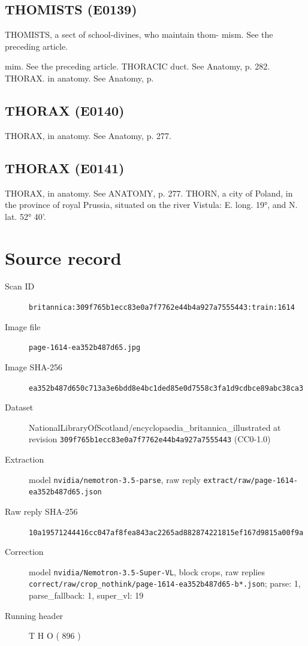 \documentclass{article}
\begin{document}
\subsection*{THOMISTS (E0139)}
THOMISTS, a sect of school-divines, who maintain thom-
mism. See the preceding article.

mim. See the preceding article.
THORACIC duct. See Anatomy, p. 282.
THORAX. in anatomy. See Anatomy, p.

\subsection*{THORAX (E0140)}
THORAX, in anatomy. See Anatomy, p. 277.

\subsection*{THORAX (E0141)}
THORAX, in anatomy. See ANATOMY, p. 277.
THORN, a city of Poland, in the province of royal Prussia, situated on the river Vistula: E. long. 19°, and N. lat. 52° 40'.


\section*{Source record}
\begin{description}
\item[Scan ID] \texttt{britannica:309f765b1ecc83e0a7f7762e44b4a927a7555443:train:1614}
\item[Image file] \texttt{page-1614-ea352b487d65.jpg}
\item[Image SHA-256] \texttt{ea352b487d650c713a3e6bdd8e4bc1ded85e0d7558c3fa1d9cdbce89abc38ca3}
\item[Dataset] NationalLibraryOfScotland/encyclopaedia\_britannica\_illustrated at revision \texttt{309f765b1ecc83e0a7f7762e44b4a927a7555443} (CC0-1.0)
\item[Extraction] model \texttt{nvidia/nemotron-3.5-parse}, raw reply \texttt{extract/raw/page-1614-ea352b487d65.json}
\item[Raw reply SHA-256] \texttt{10a19571244416cc047af8fea843ac2265ad882874221815ef167d9815a00f9a}
\item[Correction] model \texttt{nvidia/Nemotron-3.5-Super-VL}, block crops, raw replies \texttt{correct/raw/crop\_nothink/page-1614-ea352b487d65-b*.json}; parse: 1, parse\_fallback: 1, super\_vl: 19
\item[Running header] T H O ( 896 )
\end{description}
\end{document}
